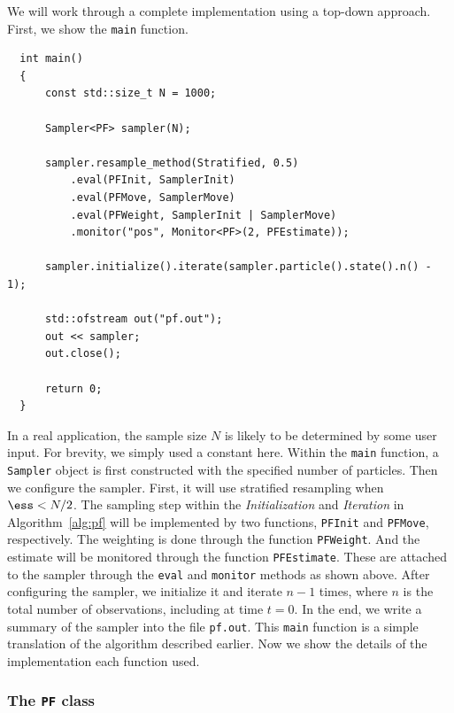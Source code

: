 We will work through a complete implementation using a top-down approach.
First, we show the \verb|main| function.
\begin{Verbatim}
  int main()
  {
      const std::size_t N = 1000;

      Sampler<PF> sampler(N);

      sampler.resample_method(Stratified, 0.5)
          .eval(PFInit, SamplerInit)
          .eval(PFMove, SamplerMove)
          .eval(PFWeight, SamplerInit | SamplerMove)
          .monitor("pos", Monitor<PF>(2, PFEstimate));

      sampler.initialize().iterate(sampler.particle().state().n() - 1);

      std::ofstream out("pf.out");
      out << sampler;
      out.close();

      return 0;
  }
\end{Verbatim}
In a real application, the sample size $N$ is likely to be determined by some
user input. For brevity, we simply used a constant here. Within the \verb|main|
function, a \verb|Sampler| object is first constructed with the specified
number of particles. Then we configure the sampler. First, it will use
stratified resampling when $\ess < N / 2$. The sampling step within the
\emph{Initialization} and \emph{Iteration} in Algorithm~\ref{alg:pf} will be
implemented by two functions, \verb|PFInit| and \verb|PFMove|, respectively.
The weighting is done through the function \verb|PFWeight|. And the estimate
will be monitored through the function \verb|PFEstimate|. These are attached to
the sampler through the \verb|eval| and \verb|monitor| methods as shown above.
After configuring the sampler, we initialize it and iterate $n - 1$ times,
where $n$ is the total number of observations, including at time $t = 0$. In
the end, we write a summary of the sampler into the file \verb|pf.out|. This
\verb|main| function is a simple translation of the algorithm described
earlier. Now we show the details of the implementation each function used.

\subsubsection{The \texttt{PF} class}

